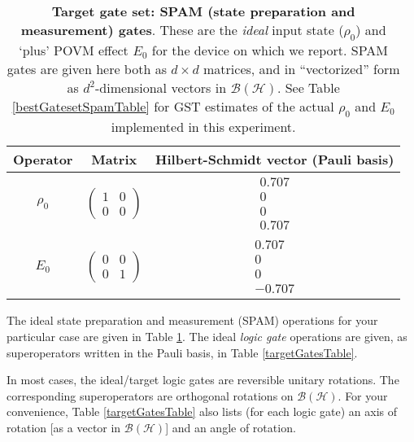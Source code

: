 \documentclass{article}[11pt]
\begin{document}
\begin{table}[h]
\begin{center}
\begin{tabular}[l]{|c|c|c|}
\hline
Operator & Matrix & Hilbert-Schmidt vector (Pauli basis) \\ \hline
$\rho_{0}$ & $ \left(\!\!\begin{array}{cc}
1 & 0 \\ 
0 & 0
 \end{array}\!\!\right) $
 & $ \begin{array}{c}
0.707 \\ 
0 \\ 
0 \\ 
0.707
 \end{array} $
 \\ \hline
$E_{0}$ & $ \left(\!\!\begin{array}{cc}
0 & 0 \\ 
0 & 1
 \end{array}\!\!\right) $
 & $ \begin{array}{c}
0.707 \\ 
0 \\ 
0 \\ 
-0.707
 \end{array} $
 \\ \hline
\end{tabular}

\caption{\textbf{Target gate set: SPAM (state preparation and measurement) gates}.  These are the \emph{ideal} input state ($\rho_0$) and `plus' POVM effect $E_0$ for the device on which we report.  SPAM gates are given here both as $d\times d$ matrices, and in ``vectorized'' form as $d^2$-dimensional vectors in $\mathcal{B}(\mathcal{H})$.  See Table \ref{bestGatesetSpamTable} for GST estimates of the actual $\rho_0$ and $E_0$ implemented in this experiment.\label{targetSpamTable}}
\end{center}
\end{table}

The ideal state preparation and measurement (SPAM) operations for your particular case are given in Table \ref{targetSpamTable}.  The ideal \emph{logic gate} operations are given, as superoperators written in the Pauli basis, in Table \ref{targetGatesTable}.

In most cases, the ideal/target logic gates are reversible unitary rotations.  The corresponding superoperators are orthogonal rotations on $\mathcal{B}(\mathcal{H})$.  For your convenience, Table \ref{targetGatesTable} also lists (for each logic gate) an axis of rotation [as a vector in $\mathcal{B}(\mathcal{H})$] and an angle of rotation.  
\end{document}
